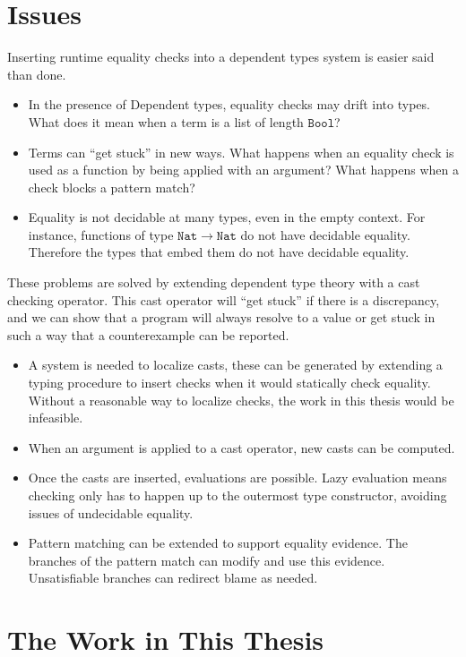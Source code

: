 \section{Issues}

Inserting runtime equality checks into a dependent types system is easier said than done.
\begin{itemize}
\item In the presence of Dependent types, equality checks may drift into types.
What does it mean when a term is a list of length $\mathtt{Bool}$?
\item Terms can ``get stuck'' in new ways. 
What happens when an equality check is used as a function by being applied with an argument?
What happens when a check blocks a pattern match?
\item Equality is not decidable at many types, even in the empty context.
For instance, functions of type $\mathtt{Nat}\rightarrow\mathtt{Nat}$ do not have decidable equality.
Therefore the types that embed them do not have decidable equality.
\end{itemize}
These problems are solved by extending dependent type theory with a cast checking operator.
This cast operator will ``get stuck'' if there is a discrepancy, and we can show that a program will always resolve to a value or get stuck in such a way that a counterexample can be reported.
\begin{itemize}
\item A system is needed to localize casts, these can be generated by extending a \textbf{\bidir{}} typing procedure to insert checks when it would statically check equality.
Without a reasonable way to localize checks, the work in this thesis would be infeasible.
\item When an argument is applied to a cast operator, new casts can be computed. %
\item Once the casts are inserted, evaluations are possible.
Lazy evaluation means checking only has to happen up to the outermost type constructor, avoiding issues of undecidable equality.
\item Pattern matching can be extended to support equality evidence.
The branches of the pattern match can modify and use this evidence.
Unsatisfiable branches can redirect blame as needed.
\end{itemize}

\section{The Work in This Thesis}


